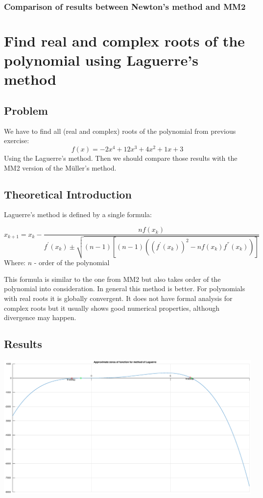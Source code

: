 \documentclass[12pt]{report}
\begin{document}
\subsection{Comparison of results between Newton's method and MM2}

\chapter{Find real and complex roots of the polynomial using Laguerre's method}

\section{Problem}
We have to find all (real and complex) roots of the polynomial from previous exercise:
\[ f(x) = -2x^4+12x^3+4x^2+1x+3 \]
Using the Laguerre's method. Then we should compare those results with the MM2 version of the  M{\"u}ller's method.


\section{Theoretical Introduction}
Laguerre's method is defined by a single formula:

\[ x_{k+1} = x_k - \frac{nf(x_k)}{f^{'}(x_k) \pm \sqrt{(n-1)[(n-1)( (f^{'}(x_k))^2 - nf(x_k)f^{''}(x_k) )]}} \]
Where:
$n$ - order of the polynomial

This formula is similar to the one from MM2 but also takes order of the polynomial into consideration. In general this method is better. For polynomials with real roots it is globally convergent. It does not have formal analysis for complex roots but it usually shows good numerical properties, although divergence may happen.

\section{Results}

\begin{center}
   \includegraphics[scale=0.25]{task3overall.eps}
\end{center}
\end{document}
